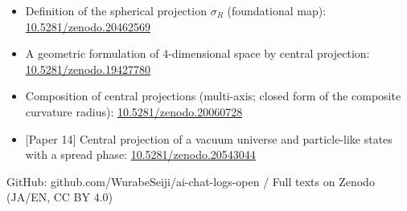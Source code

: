 \documentclass[
  10pt,
]{article}
\providecommand{\tightlist}{%
  \setlength{\itemsep}{0pt}\setlength{\parskip}{0pt}}
\begin{document}
\begin{itemize}
\tightlist
\item
  Definition of the spherical projection \(\sigma_R\) (foundational
  map):
  \href{https://doi.org/10.5281/zenodo.20462569}{10.5281/zenodo.20462569}
\item
  A geometric formulation of 4-dimensional space by central projection:
  \href{https://doi.org/10.5281/zenodo.19427780}{10.5281/zenodo.19427780}
\item
  Composition of central projections (multi-axis; closed form of the
  composite curvature radius):
  \href{https://doi.org/10.5281/zenodo.20060728}{10.5281/zenodo.20060728}
\item
  {[}Paper 14{]} Central projection of a vacuum universe and
  particle-like states with a spread phase:
  \href{https://doi.org/10.5281/zenodo.20543044}{10.5281/zenodo.20543044}
\end{itemize}

GitHub: github.com/WurabeSeiji/ai-chat-logs-open / Full texts on Zenodo
(JA/EN, CC BY 4.0)
\end{document}
